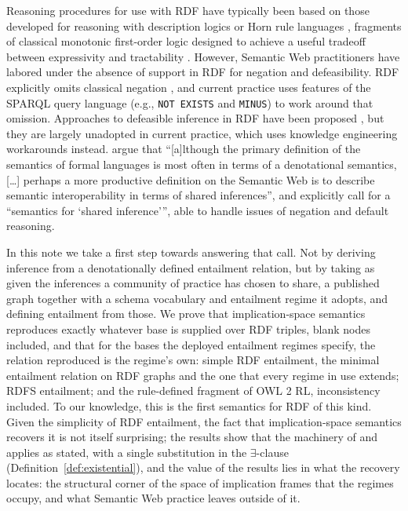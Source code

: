 \documentclass[12pt]{article}
\theoremstyle{definition}
\begin{document}
Reasoning procedures for use with RDF have typically been based on those developed for reasoning with description logics \citep{baader2007description} or Horn rule languages \citep{munoz2009simple,motik2014parallel,nenov2015rdfox}, fragments of classical monotonic first-order logic designed to achieve a useful tradeoff between expressivity and tractability \citep{levesque1987expressiveness}. However, Semantic Web practitioners have labored under the absence of support in RDF for negation and defeasibility. RDF explicitly omits classical negation \citep{hayes2014rdf}, and current practice uses features of the SPARQL query language \citep{harris2013sparql} (e.g., \texttt{NOT EXISTS} and \texttt{MINUS}) to work around that omission. Approaches to defeasible inference in RDF have been proposed \citep{bassiliades2004drdevice,antoniou2007drprolog}, but they are largely unadopted in current practice, which uses knowledge engineering workarounds \citep{rector2004defaults,hoehndorf2007representing} instead. 
\citet{hitzler2010reasonable} argue that ``[a]lthough the primary definition of the semantics of formal languages is most often in terms of a denotational semantics, [\ldots] perhaps a more productive definition on the Semantic Web is to describe semantic interoperability in terms of shared inferences'', and explicitly call for a ``semantics for `shared inference'{}'', able to handle issues of negation and default reasoning.

In this note we take a first step towards answering that call. Not by deriving inference from a denotationally defined entailment relation, but by taking as given the inferences a community of practice has chosen to share, a published graph together with a schema vocabulary and entailment regime it adopts, and defining entailment from those. We prove that implication-space semantics \citep{hlobil2025reasons} reproduces exactly whatever base is supplied over RDF triples, blank nodes included, and that for the bases the deployed entailment regimes specify, the relation reproduced is the regime's own: simple RDF entailment, the minimal entailment relation on RDF graphs and the one that every regime in use extends; RDFS entailment; and the rule-defined fragment of OWL 2 RL, inconsistency included. To our knowledge, this is the first semantics for RDF of this kind. Given the simplicity of RDF entailment, the fact that implication-space semantics recovers it is not itself surprising; the results show that the machinery of \citet{hlobil2025reasons} and \citet{hlobil2026firstorder} applies as stated, with a single substitution in the $\exists$-clause (Definition~\ref{def:existential}), and the value of the results lies in what the recovery locates: the structural corner of the space of implication frames that the regimes occupy, and what Semantic Web practice leaves outside of it.
\end{document}
